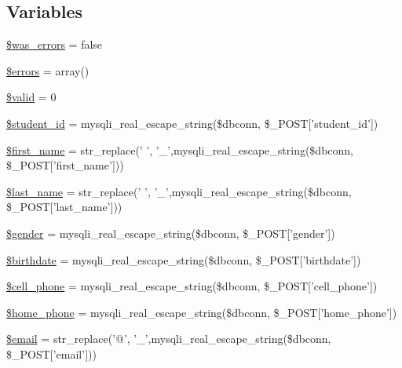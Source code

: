 \subsection*{\-Variables}
\begin{DoxyCompactItemize}
\item 
\hyperlink{user__view_2validate_2studentVal_8php_ae8f928f475945454d3cfd1d4214c09f2}{\$was\-\_\-errors} = false
\item 
\hyperlink{user__view_2validate_2studentVal_8php_ab24faf4aa647cdcee494fc48524ad4ff}{\$errors} = array()
\item 
\hyperlink{user__view_2validate_2studentVal_8php_a0587674d27d00ef497e08e53ccf45bbb}{\$valid} = 0
\item 
\hyperlink{user__view_2validate_2studentVal_8php_a70806170d1b60ef7fb76db46f2bce5e3}{\$student\-\_\-id} = mysqli\-\_\-real\-\_\-escape\-\_\-string(\$dbconn, \$\-\_\-\-P\-O\-S\-T\mbox{[}'student\-\_\-id'\mbox{]})
\item 
\hyperlink{user__view_2validate_2studentVal_8php_ae0a75279f3627fb32311bc3352c89fe6}{\$first\-\_\-name} = str\-\_\-replace(' ', '\-\_\-',mysqli\-\_\-real\-\_\-escape\-\_\-string(\$dbconn, \$\-\_\-\-P\-O\-S\-T\mbox{[}'first\-\_\-name'\mbox{]}))
\item 
\hyperlink{user__view_2validate_2studentVal_8php_a7aa024f049337e3bb2365d4007262847}{\$last\-\_\-name} = str\-\_\-replace(' ', '\-\_\-',mysqli\-\_\-real\-\_\-escape\-\_\-string(\$dbconn, \$\-\_\-\-P\-O\-S\-T\mbox{[}'last\-\_\-name'\mbox{]}))
\item 
\hyperlink{user__view_2validate_2studentVal_8php_a0f1d7cfb9dc6f494b9014885205fc47e}{\$gender} = mysqli\-\_\-real\-\_\-escape\-\_\-string(\$dbconn, \$\-\_\-\-P\-O\-S\-T\mbox{[}'gender'\mbox{]})
\item 
\hyperlink{user__view_2validate_2studentVal_8php_a1d5a040d6cd65b40daa47911e18adbb0}{\$birthdate} = mysqli\-\_\-real\-\_\-escape\-\_\-string(\$dbconn, \$\-\_\-\-P\-O\-S\-T\mbox{[}'birthdate'\mbox{]})
\item 
\hyperlink{user__view_2validate_2studentVal_8php_a04f4e771f2239bf8a55f2ee7580a9609}{\$cell\-\_\-phone} = mysqli\-\_\-real\-\_\-escape\-\_\-string(\$dbconn, \$\-\_\-\-P\-O\-S\-T\mbox{[}'cell\-\_\-phone'\mbox{]})
\item 
\hyperlink{user__view_2validate_2studentVal_8php_af8981335f6e9218851c725816b60158e}{\$home\-\_\-phone} = mysqli\-\_\-real\-\_\-escape\-\_\-string(\$dbconn, \$\-\_\-\-P\-O\-S\-T\mbox{[}'home\-\_\-phone'\mbox{]})
\item 
\hyperlink{user__view_2validate_2studentVal_8php_ad634f418b20382e2802f80532d76d3cd}{\$email} = str\-\_\-replace('@', '\-\_\-',mysqli\-\_\-real\-\_\-escape\-\_\-string(\$dbconn, \$\-\_\-\-P\-O\-S\-T\mbox{[}'email'\mbox{]}))

\end{DoxyCompactItemize}
